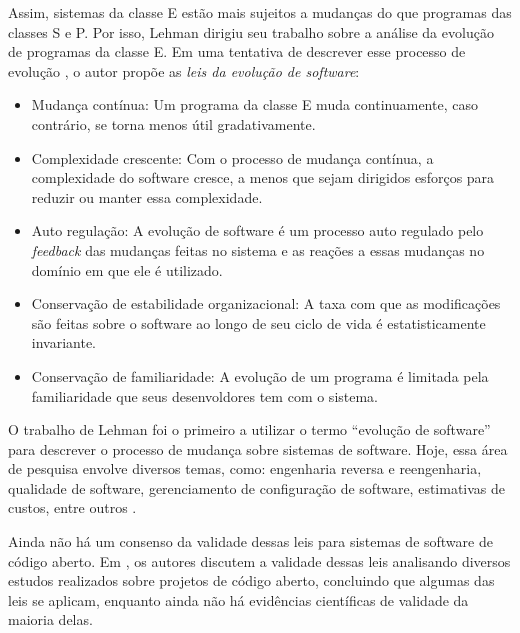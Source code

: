 \documentclass[a4paper, 12pt, twoside]{book}
\begin{document}
        Assim, sistemas da classe E estão mais sujeitos a mudanças do que programas das classes S 
        e P. Por isso, Lehman dirigiu seu trabalho sobre a análise da evolução de programas da 
        classe E. Em uma tentativa de descrever esse processo de evolução \cite{Lehman1980b}, o 
        autor propõe as \textit{leis da evolução de software}:
        \begin{itemize}
            \item Mudança contínua: Um programa da classe E muda continuamente, caso contrário, se 
                   torna menos útil gradativamente.
            \item Complexidade crescente: Com o processo de mudança contínua, a complexidade do 
                  software cresce, a menos que sejam dirigidos esforços para reduzir ou manter essa 
                  complexidade.
            \item Auto regulação: A evolução de software é um processo auto regulado pelo \textit{feedback} 
                  das mudanças feitas no sistema e as reações a essas mudanças no domínio em que ele 
                  é utilizado.
            \item Conservação de estabilidade organizacional: A taxa com que as modificações são 
                  feitas sobre o software ao longo de seu ciclo de vida é estatisticamente invariante.
            \item Conservação de familiaridade: A evolução de um programa é limitada pela 
                  familiaridade que seus desenvoldores tem com o sistema.
        \end{itemize}

        O trabalho de Lehman foi o primeiro a utilizar o termo ``evolução de software'' para
        descrever o processo de mudança sobre sistemas de software. Hoje, essa área de pesquisa
        envolve diversos temas, como: engenharia reversa e reengenharia, qualidade de software,
        gerenciamento de configuração de software, estimativas de custos, entre outros 
        \cite{DBLP:series/springer/Mens08}.
        
        Ainda não há um consenso da validade dessas leis para sistemas de software de código aberto. 
        Em  \cite{DBLP:series/springer/Fernandez-RamilLWC08}, os autores discutem a validade dessas
        leis analisando diversos estudos realizados sobre projetos de código aberto, concluindo que
        algumas das leis se aplicam, enquanto ainda não há evidências científicas de validade da 
        maioria delas.
        
\end{document}
